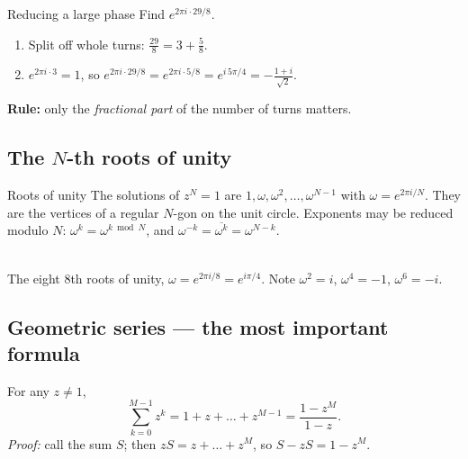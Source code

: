 \documentclass[11pt,a4paper,openany]{book}
\newcounter{wex}[chapter]
\newenvironment{steps}{\begin{enumerate}[label=\textbf{Step \arabic*.}, leftmargin=4.2em, itemsep=2pt]}{\end{enumerate}}
\begin{document}
\begin{wexample}{Reducing a large phase}
Find $e^{2\pi i\cdot 29/8}$.
\begin{steps}
\item Split off whole turns: $\frac{29}{8} = 3 + \frac58$.
\item $e^{2\pi i\cdot 3} = 1$, so $e^{2\pi i\cdot 29/8} = e^{2\pi i\cdot 5/8} = e^{i\,5\pi/4} = -\frac{1+i}{\sqrt2}$.
\end{steps}
\textbf{Rule:} only the \emph{fractional part} of the number of turns matters.
\end{wexample}

\subsection{The $N$-th roots of unity}
\begin{defn}{Roots of unity}
The solutions of $z^N = 1$ are $1, \omega, \omega^2, \dots, \omega^{N-1}$ with $\omega = e^{2\pi i/N}$. They are the vertices of a regular
$N$-gon on the unit circle. Exponents may be reduced modulo $N$: $\omega^{k} = \omega^{k \bmod N}$, and $\omega^{-k} = \overline{\omega^{k}} = \omega^{N-k}$.
\end{defn}

\begin{center}
\\
{\small The eight 8th roots of unity, $\omega = e^{2\pi i/8} = e^{i\pi/4}$. Note $\omega^2 = i$, $\omega^4 = -1$, $\omega^6 = -i$.}
\end{center}

\subsection{Geometric series --- the most important formula}
For any $z \neq 1$,
\[ \sum_{k=0}^{M-1} z^k = 1 + z + \dots + z^{M-1} = \frac{1 - z^M}{1 - z}. \]
\emph{Proof:} call the sum $S$; then $zS = z + \dots + z^M$, so $S - zS = 1 - z^M$.
\end{document}
